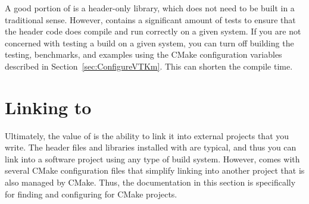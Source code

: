 \begin{didyouknow}
  A good portion of \VTKm is a header-only library, which does not need to be built in a traditional sense.
  However, \VTKm contains a significant amount of tests to ensure that the header code does compile and run correctly on a given system.
  If you are not concerned with testing a build on a given system, you can turn off building the testing, benchmarks, and examples using the CMake configuration variables described in Section~\ref{sec:ConfigureVTKm}.
  This can shorten the \VTKm compile time.
\end{didyouknow}


\section{Linking to \VTKm}

Ultimately, the value of \VTKm is the ability to link it into external projects that you write.
The header files and libraries installed with \VTKm are typical, and thus you can link \VTKm into a software project using any type of build system.
However, \VTKm comes with several CMake configuration files that simplify linking \VTKm into another project that is also managed by CMake.
Thus, the documentation in this section is specifically for finding and configuring \VTKm for CMake projects.




